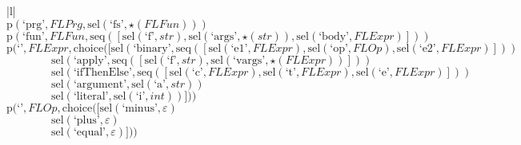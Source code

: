 \footnotesize\begin{center}\begin{tabular}{|l|}\hline
{}
\\\hline
$\mathrm{p}(\text{`prg'},\mathit{FLPrg},\mathrm{sel}\left(\text{`fs'},\star \left(\mathit{FLFun}\right)\right))$	\\
$\mathrm{p}(\text{`fun'},\mathit{FLFun},\mathrm{seq}\left(\left[\mathrm{sel}\left(\text{`f'},str\right), \mathrm{sel}\left(\text{`args'},\star \left(str\right)\right), \mathrm{sel}\left(\text{`body'},\mathit{FLExpr}\right)\right]\right))$	\\
$\mathrm{p}(\text{`'},\mathit{FLExpr},\mathrm{choice}([\mathrm{sel}\left(\text{`binary'},\mathrm{seq}\left(\left[\mathrm{sel}\left(\text{`e1'},\mathit{FLExpr}\right), \mathrm{sel}\left(\text{`op'},\mathit{FLOp}\right), \mathrm{sel}\left(\text{`e2'},\mathit{FLExpr}\right)\right]\right)\right)$\\$\qquad\qquad\mathrm{sel}\left(\text{`apply'},\mathrm{seq}\left(\left[\mathrm{sel}\left(\text{`f'},str\right), \mathrm{sel}\left(\text{`vargs'},\star \left(\mathit{FLExpr}\right)\right)\right]\right)\right)$\\$\qquad\qquad\mathrm{sel}\left(\text{`ifThenElse'},\mathrm{seq}\left(\left[\mathrm{sel}\left(\text{`c'},\mathit{FLExpr}\right), \mathrm{sel}\left(\text{`t'},\mathit{FLExpr}\right), \mathrm{sel}\left(\text{`e'},\mathit{FLExpr}\right)\right]\right)\right)$\\$\qquad\qquad\mathrm{sel}\left(\text{`argument'},\mathrm{sel}\left(\text{`a'},str\right)\right)$\\$\qquad\qquad\mathrm{sel}\left(\text{`literal'},\mathrm{sel}\left(\text{`i'},int\right)\right)]))$	\\
$\mathrm{p}(\text{`'},\mathit{FLOp},\mathrm{choice}([\mathrm{sel}\left(\text{`minus'},\varepsilon\right)$\\$\qquad\qquad\mathrm{sel}\left(\text{`plus'},\varepsilon\right)$\\$\qquad\qquad\mathrm{sel}\left(\text{`equal'},\varepsilon\right)]))$	\\
\hline\end{tabular}\end{center}



